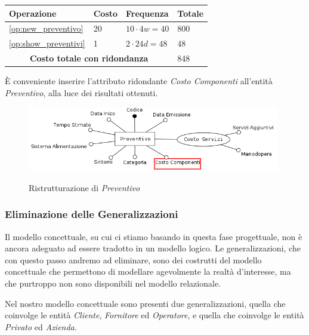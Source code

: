 					\begin{tabular}{| p{3cm} | p{3cm} | p{3cm} | p{3cm} |}
						\hline
						\textbf{Operazione} & \textbf{Costo} & \textbf{Frequenza} & \textbf{Totale} \\ \hline
						\ref{op:new_preventivo}		& 20 	& $10 \cdot 4w = 40$	& 800	\\
						\ref{op:show_preventivi} 	& 1 	& $2 \cdot 24d = 48$	& 48	\\
						\hline
						\multicolumn{3}{|c|}{\textbf{Costo totale con ridondanza}} & 848 \\
						\hline
					\end{tabular}
					\vspace{2ex}

					È conveniente inserire l'attributo ridondante \emph{Costo Componenti} all'entità \emph{Preventivo}, alla luce dei risultati ottenuti.

					\begin{figure}[H]
						\includegraphics[width=11cm]{images/refactor/preventivo.png}
						\centering
						\label{fig:preventivo_refactor}
						\caption{Ristrutturazione di \emph{Preventivo}}
					\end{figure}

		\subsubsection{Eliminazione delle Generalizzazioni}

			Il modello concettuale, su cui ci stiamo basando in questa fase progettuale, non è ancora adeguato ad essere tradotto in un modello logico. Le generalizzazioni, che con questo passo andremo ad eliminare, sono dei costrutti del modello concettuale che permettono di modellare agevolmente la realtà d'interesse, ma che purtroppo non sono disponibili nel modello relazionale.

			Nel nostro modello concettuale sono presenti due generalizzazioni, quella che coinvolge le entità \emph{Cliente}, \emph{Fornitore} ed \emph{Operatore}, e quella che coinvolge le entità \emph{Privato} ed \emph{Azienda}.

